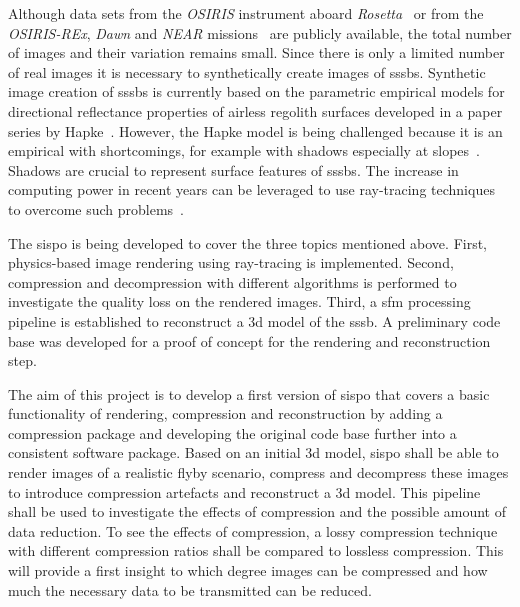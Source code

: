 Although data sets from the \textit{OSIRIS} instrument aboard \textit{Rosetta}~\cite{osirisArchive} or from the \textit{OSIRIS-REx}, \textit{Dawn} and \textit{NEAR} missions~\cite{palmer2014small} are publicly available, the total number of images and their variation remains small. Since there is only a limited number of real images it is necessary to synthetically create images of \glspl{sssb}. Synthetic image creation of \glspl{sssb} is currently based on the parametric empirical models for directional reflectance properties of airless regolith surfaces developed in a paper series by Hapke~\cite{Hapke1981BidirectionalTheory, hapke1981bidirectional2, Hapke1984BidirectionalRoughness, Hapke1986BidirectionalEffect, Hapke2002BidirectionalScattering, Hapke2008BidirectionalPorosity, Hapke2012Bidirectional7}. However, the Hapke model is being challenged because it is an empirical with shortcomings, for example with shadows especially at slopes~\cite{shkuratov2012critical}. Shadows are crucial to represent surface features of \glspl{sssb}. The increase in computing power in recent years can be leveraged to use ray-tracing techniques to overcome such problems~\cite{shkuratov2012critical, lafortune1996mathematical}.


The \gls{sispo} is being developed to cover the three topics mentioned above. First, physics-based image rendering using ray-tracing is implemented. Second, compression and decompression with different algorithms is performed to investigate the quality loss on the rendered images. Third, a \gls{sfm} processing pipeline is established to reconstruct a \gls{3d} model of the \gls{sssb}. A preliminary code base was developed for a proof of concept for the rendering and reconstruction step.

The aim of this project is to develop a first version of \gls{sispo} that covers a basic functionality of rendering, compression and reconstruction by adding a compression package and developing the original code base further into a consistent software package. Based on an initial \gls{3d} model, \gls{sispo} shall be able to render images of a realistic flyby scenario, compress and decompress these images to introduce compression artefacts and reconstruct a \gls{3d} model. This pipeline shall be used to investigate the effects of compression and the possible amount of data reduction. To see the effects of compression, a lossy compression technique with different compression ratios shall be compared to lossless compression. This will provide a first insight to which degree images can be compressed and how much the necessary data to be transmitted can be reduced.

